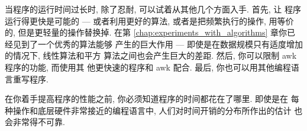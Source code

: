 当程序的运行时间过长时, 除了忍耐, 可以试着从其他几个方面入手. 首先, 让
程序运行得更快是可能的 --- 或者利用更好的算法, 或者是把频繁执行的操作,
用等价的, 但是更轻量的操作替换掉. 在第
\ref{chap:experiments_with_algorithms} 章你已经见到了一个优秀的算法能够
产生的巨大作用 --- 即使是在数据规模只有适度增加的情况下, 线性算法和平方
算法之间也会产生巨大的差距. 然后, 你可以限制 awk 程序的功能, 而使用其
他更快速的程序和 awk 配合. 最后, 你也可以用其他编程语言重写程序.

在你着手提高程序的性能之前, 你必须知道程序的时间都花在了哪里. 即使是在 
每种操作和底层硬件非常接近的编程语言中, 人们对时间开销的分布所作出的估计
也会非常得不可靠.
